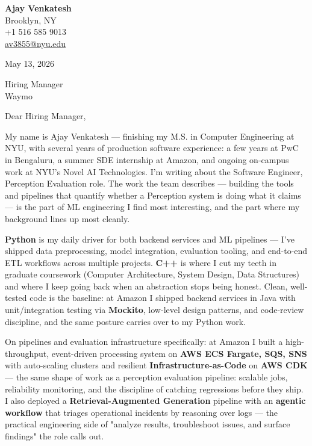 \documentclass[letterpaper,11pt]{article}
\begin{document}
\begin{flushleft}
\textbf{\large Ajay Venkatesh} \\
Brooklyn, NY \\
+1 516 585 9013 \\
\href{mailto:av3855@nyu.edu}{av3855@nyu.edu}
\end{flushleft}

\vspace{10pt}

May 13, 2026

\vspace{6pt}

Hiring Manager \\
Waymo

\vspace{10pt}

Dear Hiring Manager,

My name is Ajay Venkatesh --- finishing my M.S. in Computer Engineering at NYU, with several years of production software experience: a few years at PwC in Bengaluru, a summer SDE internship at Amazon, and ongoing on-campus work at NYU's Novel AI Technologies. I'm writing about the Software Engineer, Perception Evaluation role. The work the team describes --- building the tools and pipelines that quantify whether a Perception system is doing what it claims --- is the part of ML engineering I find most interesting, and the part where my background lines up most cleanly.

\textbf{Python} is my daily driver for both backend services and ML pipelines --- I've shipped data preprocessing, model integration, evaluation tooling, and end-to-end ETL workflows across multiple projects. \textbf{C++} is where I cut my teeth in graduate coursework (Computer Architecture, System Design, Data Structures) and where I keep going back when an abstraction stops being honest. Clean, well-tested code is the baseline: at Amazon I shipped backend services in Java with unit/integration testing via \textbf{Mockito}, low-level design patterns, and code-review discipline, and the same posture carries over to my Python work.

On pipelines and evaluation infrastructure specifically: at Amazon I built a high-throughput, event-driven processing system on \textbf{AWS ECS Fargate, SQS, SNS} with auto-scaling clusters and resilient \textbf{Infrastructure-as-Code} on \textbf{AWS CDK} --- the same shape of work as a perception evaluation pipeline: scalable jobs, reliability monitoring, and the discipline of catching regressions before they ship. I also deployed a \textbf{Retrieval-Augmented Generation} pipeline with an \textbf{agentic workflow} that triages operational incidents by reasoning over logs --- the practical engineering side of "analyze results, troubleshoot issues, and surface findings" the role calls out.
\end{document}
